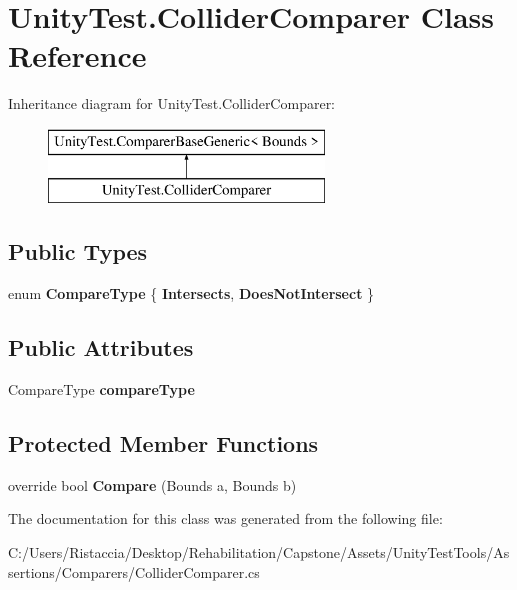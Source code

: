 \hypertarget{class_unity_test_1_1_collider_comparer}{}\section{Unity\+Test.\+Collider\+Comparer Class Reference}
\label{class_unity_test_1_1_collider_comparer}
Inheritance diagram for Unity\+Test.\+Collider\+Comparer\+:\begin{figure}[H]
\begin{center}
\leavevmode
\includegraphics[height=2.000000cm]{class_unity_test_1_1_collider_comparer}
\end{center}
\end{figure}
\subsection*{Public Types}
\begin{DoxyCompactItemize}
\item 
\mbox{\label{class_unity_test_1_1_collider_comparer_afc6f102cc9640ca2cf4af16cebb8a99b}} 
enum {\bfseries Compare\+Type} \{ {\bfseries Intersects}, 
{\bfseries Does\+Not\+Intersect}
 \}
\end{DoxyCompactItemize}
\subsection*{Public Attributes}
\begin{DoxyCompactItemize}
\item 
\mbox{\label{class_unity_test_1_1_collider_comparer_a49c7a0ce06e8f763dda8027847da6b2e}} 
Compare\+Type {\bfseries compare\+Type}
\end{DoxyCompactItemize}
\subsection*{Protected Member Functions}
\begin{DoxyCompactItemize}
\item 
\mbox{\label{class_unity_test_1_1_collider_comparer_ab31d8a0bbf62d70a5f0dfc3741c2fe88}} 
override bool {\bfseries Compare} (Bounds a, Bounds b)
\end{DoxyCompactItemize}


The documentation for this class was generated from the following file\+:\begin{DoxyCompactItemize}
\item 
C\+:/\+Users/\+Ristaccia/\+Desktop/\+Rehabilitation/\+Capstone/\+Assets/\+Unity\+Test\+Tools/\+Assertions/\+Comparers/Collider\+Comparer.\+cs\end{DoxyCompactItemize}
